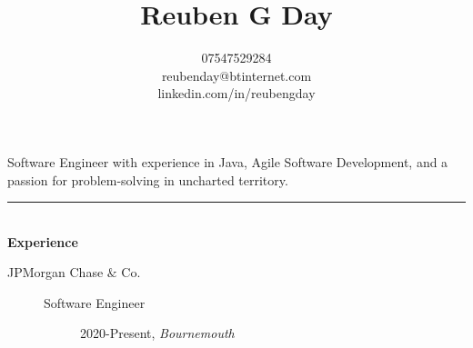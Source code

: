 \documentclass[12pt, a4paper]{article}
\date{}
\title{\vspace{-6ex}Reuben G Day }
\author{07547529284 \\ reubenday@btinternet.com \\ linkedin.com/in/reubengday}
\begin{document}
    \maketitle
    \vspace{-5ex}

    \begin{center}
        Software Engineer with experience in Java, Agile Software Development, and a passion for problem-solving in uncharted territory.
    \end{center}

    \vspace{-2ex}

    \noindent\rule{8cm}{0.4pt} \\
    \textbf{Experience}
    \begin{description}
        \item[JPMorgan Chase $\&$ Co.]\textbf{}
        \begin{description}
            \item[Software Engineer] 2020-Present, \textit{Bournemouth}

        \end{description}

    \end{description}

    \vspace{-2ex}
\end{document}
